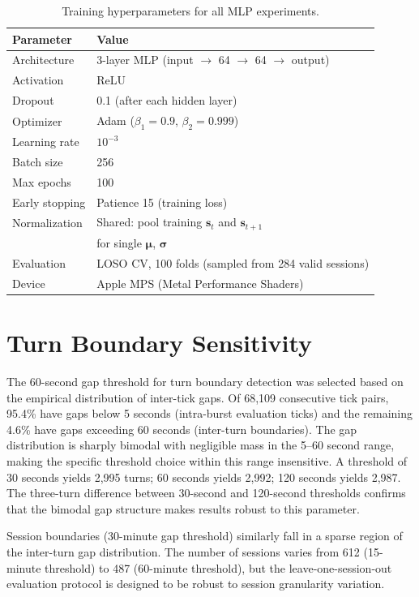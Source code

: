 \documentclass[twoside,11pt]{article}
\begin{document}
\begin{table}[h]
\caption{Training hyperparameters for all MLP experiments.}
\label{tab:hyperparams}
\centering
\small
\begin{tabular}{@{}ll@{}}
\toprule
Parameter & Value \\
\midrule
Architecture & 3-layer MLP (input $\to$ 64 $\to$ 64 $\to$ output) \\
Activation & ReLU \\
Dropout & 0.1 (after each hidden layer) \\
Optimizer & Adam ($\beta_1 = 0.9$, $\beta_2 = 0.999$) \\
Learning rate & $10^{-3}$ \\
Batch size & 256 \\
Max epochs & 100 \\
Early stopping & Patience 15 (training loss) \\
Normalization & Shared: pool training $\mathbf{s}_t$ and $\mathbf{s}_{t+1}$ \\
 & for single $\boldsymbol{\mu}$, $\boldsymbol{\sigma}$ \\
Evaluation & LOSO CV, 100 folds (sampled from 284 valid sessions) \\
Device & Apple MPS (Metal Performance Shaders) \\
\bottomrule
\end{tabular}
\end{table}


\section{Turn Boundary Sensitivity}
\label{app:sensitivity}

The 60-second gap threshold for turn boundary detection was selected based on
the empirical distribution of inter-tick gaps. Of 68,109 consecutive tick
pairs, 95.4\% have gaps below 5 seconds (intra-burst evaluation ticks) and the
remaining 4.6\% have gaps exceeding 60 seconds (inter-turn boundaries). The gap
distribution is sharply bimodal with negligible mass in the 5--60 second range,
making the specific threshold choice within this range insensitive. A threshold
of 30 seconds yields 2,995 turns; 60 seconds yields 2,992; 120 seconds yields
2,987. The three-turn difference between 30-second and 120-second thresholds
confirms that the bimodal gap structure makes results robust to this parameter.

Session boundaries (30-minute gap threshold) similarly fall in a sparse region
of the inter-turn gap distribution. The number of sessions varies from 612
(15-minute threshold) to 487 (60-minute threshold), but the leave-one-session-out
evaluation protocol is designed to be robust to session granularity variation.


\vskip 0.2in

\end{document}
